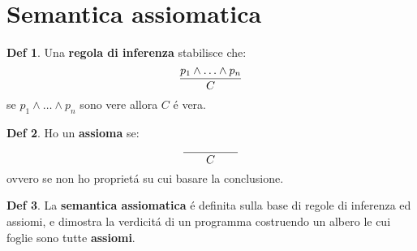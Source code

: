 \documentclass[a4paper]{report}
\theoremstyle{definition} \newtheorem*{defi}{Def}
\theoremstyle{plain} \newtheorem{lemma}{Lemma}
\theoremstyle{plain} \newtheorem{teo}{Teorema}
\theoremstyle{remark} \newtheorem*{es}{Esempio}
\DeclareRobustCommand{\frac}[3][0pt]{%
  {\begingroup\hspace{#1}#2\hspace{#1}\endgroup\over\hspace{#1}#3\hspace{#1}}}
\begin{document}
\section{Semantica assiomatica}
\begin{defi}
Una {\bf regola di inferenza} stabilisce che:
$$
\frac{p_1 \wedge \ldots \wedge p_n}{C}
$$
se $ p_1 \wedge \ldots \wedge p_n $ sono vere allora $C$ \'e vera.
\end{defi}
\begin{defi}
Ho un {\bf assioma} se:
$$
\frac[20pt]{}{C}
$$
ovvero se non ho propriet\'a su cui basare la conclusione.
\end{defi}
\begin{defi}
La {\bf semantica assiomatica} \'e definita sulla base di regole di inferenza ed assiomi, e dimostra la verdicit\'a di un programma costruendo un albero le cui foglie sono tutte {\bf assiomi}.
\end{defi}
\end{document}
